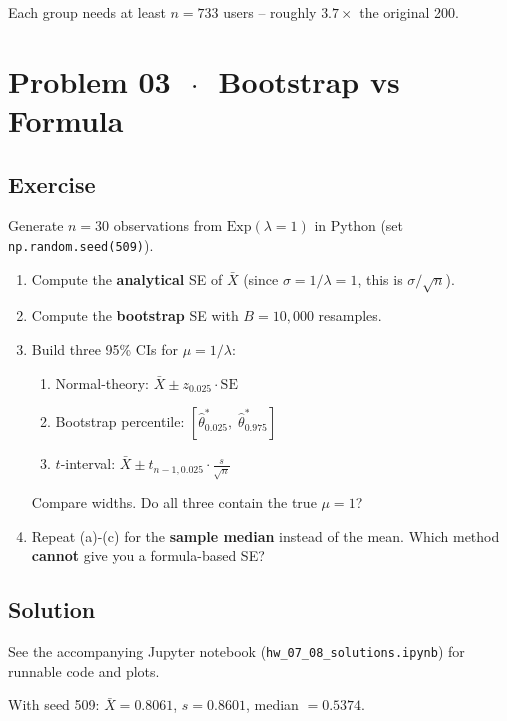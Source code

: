 \documentclass[11pt]{article}
\begin{document}
Each group needs at least $n = 733$ users -- roughly $3.7\times$ the original 200.

\section*{Problem 03 \texorpdfstring{$\,\cdot\,$}{-} Bootstrap vs Formula}

\subsection*{Exercise}

Generate $n = 30$ observations from $\text{Exp}(\lambda = 1)$ in Python (set \texttt{np.random.seed(509)}).

\begin{enumerate}[label=\alph*)]
  \item Compute the \textbf{analytical} SE of $\bar{X}$ (since $\sigma = 1/\lambda = 1$, this is $\sigma / \sqrt{n}$).
  \item Compute the \textbf{bootstrap} SE with $B = 10{,}000$ resamples.
  \item Build three 95\% CIs for $\mu = 1/\lambda$:
  \begin{enumerate}[label=(\roman*)]
    \item Normal-theory: $\bar{X} \pm z_{0.025} \cdot \text{SE}$
    \item Bootstrap percentile: $[\hat{\theta}^*_{0.025},\; \hat{\theta}^*_{0.975}]$
    \item $t$-interval: $\bar{X} \pm t_{n-1, 0.025} \cdot \frac{s}{\sqrt{n}}$
  \end{enumerate}
  Compare widths. Do all three contain the true $\mu = 1$?
  \item Repeat (a)-(c) for the \textbf{sample median} instead of the mean. Which method \textbf{cannot} give you a formula-based SE?
\end{enumerate}

\subsection*{Solution}

See the accompanying Jupyter notebook (\texttt{hw\_07\_08\_solutions.ipynb}) for runnable code and plots.

With seed 509: $\bar{X} = 0.8061$, $s = 0.8601$, median $= 0.5374$.
\end{document}
